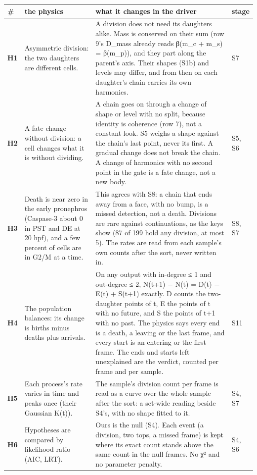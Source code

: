 {\footnotesize
\setlength{\tabcolsep}{6pt}
\begin{longtable}{>{\RaggedRight\arraybackslash}p{}>{\RaggedRight\arraybackslash}p{}>{\RaggedRight\arraybackslash}p{}>{\RaggedRight\arraybackslash}p{}}
\toprule
\# & the physics & what it changes in the driver & stage \\
\midrule
\endhead
\textbf{H1} & Asymmetric division: the two daughters are different cells. & A division does not need its daughters alike. Mass is conserved on their sum (row 9's D\_\allowbreak{}mass already reads β(m\_\allowbreak{}c + m\_\allowbreak{}s) = β(m\_\allowbreak{}p)), and they part along the parent's axis. Their shapes (S1b) and levels may differ, and from then on each daughter's chain carries its own harmonics. & S7 \\
\textbf{H2} & A fate change without division: a cell changes what it is without dividing. & A chain goes on through a change of shape or level with no split, because identity is coherence (row 7), not a constant look. S5 weighs a shape against the chain's last point, never its first. A gradual change does not break the chain. A change of harmonics with no second point in the gate is a fate change, not a new body. & S5, S6 \\
\textbf{H3} & Death is near zero in the early pronephros (Caspase-3 about 0 in PST and DE at 20 hpf), and a few percent of cells are in G2/M at a time. & This agrees with S8: a chain that ends away from a face, with no bump, is a missed detection, not a death. Divisions are rare against continuations, as the keys show (87 of 199 hold any division, at most 5). The rates are read from each sample's own counts after the sort, never written in. & S8, S7 \\
\textbf{H4} & The population balances: its change is births minus deaths plus arrivals. & On any output with in-degree ≤ 1 and out-degree ≤ 2, N(t+1) − N(t) = D(t) − E(t) + S(t+1) exactly. D counts the two-daughter points of t, E the points of t with no future, and S the points of t+1 with no past. The physics says every end is a death, a leaving or the last frame, and every start is an entering or the first frame. The ends and starts left unexplained are the verdict, counted per frame and per sample. & S11 \\
\textbf{H5} & Each process's rate varies in time and peaks once (their Gaussian K(t)). & The sample's division count per frame is read as a curve over the whole sample after the sort: a set-wide reading beside S4's, with no shape fitted to it. & S4, S7 \\
\textbf{H6} & Hypotheses are compared by likelihood ratio (AIC, LRT). & Ours is the null (S4). Each event (a division, two tops, a missed frame) is kept where its exact count stands above the same count in the null frames. No χ² and no parameter penalty. & S4, S6 \\
\bottomrule
\end{longtable}
}

